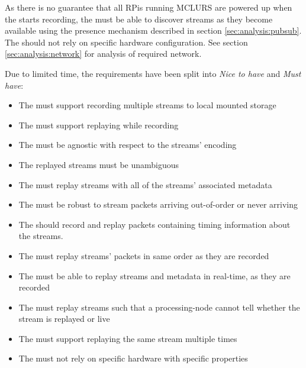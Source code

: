 As there is no guarantee that all RPis running \ac{MCLURS} are powered up when the  starts recording, the  must be able to discover streams as they become available using the presence mechanism described in section \ref{sec:analysis:pubsub}.
The  should not rely on specific hardware configuration. See section \ref{sec:analysis:network} for analysis of required network.

Due to limited time, the requirements have been split into \textit{Nice to have} and \textit{Must have}:

\begin{itemize}
	\item The  must support recording multiple streams to local mounted storage
	\item The  must support replaying while recording
	\item The  must be agnostic with respect to the streams' encoding
	\item The replayed streams must be unambiguous
	\item The  must replay streams with all of the streams' associated metadata
	\item The  must be robust to stream packets arriving out-of-order or never arriving
	\item The \hist{} should record and replay packets containing timing information about the streams.
	\item The  must replay streams' packets in same order as they are recorded
	\item The  must be able to replay streams and metadata in real-time, as they are recorded
	\item The  must replay streams such that a processing-node cannot tell whether the stream is replayed or live
	\item The  must support replaying the same stream multiple times
	\item The  must not rely on specific hardware with specific properties
\end{itemize}

